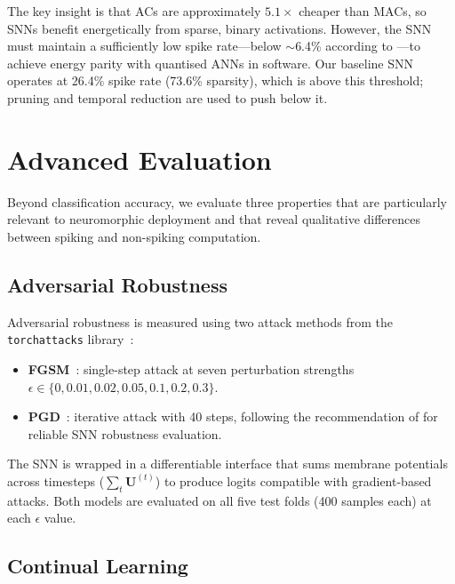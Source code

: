 The key insight is that ACs are approximately $5.1\times$ cheaper than MACs, so SNNs benefit energetically from sparse, binary activations. However, the SNN must maintain a sufficiently low spike rate---below $\sim$6.4\% according to \citet{dampfhoffer2023snns}---to achieve energy parity with quantised ANNs in software. Our baseline SNN operates at 26.4\% spike rate (73.6\% sparsity), which is above this threshold; pruning and temporal reduction are used to push below it.

\section{Advanced Evaluation}
\label{sec:advanced-eval}

Beyond classification accuracy, we evaluate three properties that are particularly relevant to neuromorphic deployment and that reveal qualitative differences between spiking and non-spiking computation.

\subsection{Adversarial Robustness}
\label{ssec:adversarial}

Adversarial robustness is measured using two attack methods from the \texttt{torchattacks} library~\citep{kim2020torchattacks}:
\begin{itemize}[nosep]
    \item \textbf{FGSM}~\citep{goodfellow2015explaining}: single-step attack at seven perturbation strengths $\epsilon \in \{0, 0.01, 0.02, 0.05, 0.1, 0.2, 0.3\}$.
    \item \textbf{PGD}~\citep{madry2018towards}: iterative attack with 40 steps, following the recommendation of \citet{wang2025reliable} for reliable SNN robustness evaluation.
\end{itemize}

The SNN is wrapped in a differentiable interface that sums membrane potentials across timesteps ($\sum_t \mathbf{U}^{(t)}$) to produce logits compatible with gradient-based attacks. Both models are evaluated on all five test folds (400 samples each) at each $\epsilon$ value.

\subsection{Continual Learning}
\label{ssec:continual}

